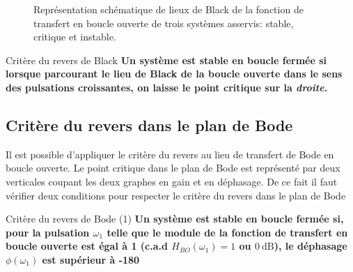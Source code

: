 \begin{figure}[!h]
\begin{center}
\end{center}
\caption{Représentation schématique de lieux de Black de la 
    fonction de transfert en boucle ouverte de trois systèmes 
    asservis: stable, critique et instable.
\label{fig-black_revers}}
\end{figure}

\begin{criteria}{Critère du revers de Black}
\textbf{Un système est stable en boucle fermée si lorsque parcourant 
        le lieu de Black de la boucle ouverte dans le sens des 
        pulsations croissantes, on laisse le point critique sur la \emph{droite}.}
\end{criteria}
\newpage
\subsection{Critère du revers dans le plan de Bode}

Il est possible d'appliquer le critère du revers au lieu de transfert de Bode
en boucle ouverte. Le point critique
dans le plan de Bode est représenté par deux verticales coupant les deux graphes en gain et en déphasage.
De ce fait il faut vérifier deux conditions pour respecter le critère du revers dans le plan de Bode

\begin{criteria}{Critère du revers de Bode (1)}
\textbf{Un système est stable en boucle fermée si, pour la pulsation $\omega_{1}$ telle que le module 
    de la fonction de transfert en boucle ouverte est égal à 1 (c.a.d $H_{BO}(\omega_{1})=1$ 
    ou $\SI{0}{\dB}$), le déphasage $\phi(\omega_1)$ est supérieur à -180\degree}
\end{criteria}

